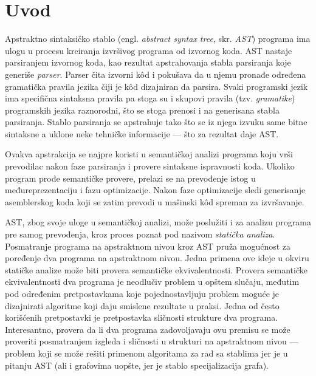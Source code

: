 \chapter{Uvod}
\label{chp:Intro}

Apstraktno sintaksičko stablo (engl. \emph{abstract syntax tree}, skr. \emph{AST}) programa ima ulogu u procesu kreiranja izvršivog programa od izvornog koda. AST nastaje parsiranjem izvornog koda, kao rezultat apstrahovanja stabla parsiranja koje generiše \emph{parser}. Parser čita izvorni k\^od i pokušava da u njemu pronađe određena gramatička pravila jezika čiji je k\^od dizajniran da parsira. Svaki programski jezik ima specifična sintaksna pravila pa stoga su i skupovi pravila (tzv. \emph{gramatike}) programskih jezika raznorodni, što se stoga prenosi i na generisana stabla parsiranja. Stablo parsiranja se apstrahuje tako što se iz njega izvuku same bitne sintaksne a uklone neke tehničke informacije --- što za rezultat daje AST.

Ovakva apstrakcija se najpre koristi u semantičkoj analizi programa koju vrši prevodilac nakon faze parsiranja i provere sintaksne ispravnosti koda. Ukoliko program prođe semantičke provere, prelazi se na prevođenje istog u međureprezentaciju i fazu optimizacije. Nakon faze optimizacije sledi generisanje asemblerskog koda koji se zatim prevodi u mašinski k\^od spreman za izvršavanje.

AST, zbog svoje uloge u semantičkoj analizi, može poslužiti i za analizu programa pre samog prevođenja, kroz proces poznat pod nazivom \emph{statička analiza}. Posmatranje programa na apstraktnom nivou kroz AST pruža mogućnost za poređenje dva programa na apstraktnom nivou. Jedna primena ove ideje u okviru statičke analize može biti provera semantičke ekvivalentnosti. Provera semantičke ekvivalentnosti dva programa je neodlučiv problem u opštem slučaju, međutim pod određenim pretpostavkama koje pojednostavljuju problem moguće je dizajnirati algoritme koji daju smislene rezultate u praksi. Jedna od često korišćenih pretpostavki je pretpostavka sličnosti strukture dva programa. Interesantno, provera da li dva programa zadovoljavaju ovu premisu se može proveriti posmatranjem izgleda i sličnosti u strukturi na apstraktnom nivou --- problem koji se može rešiti primenom algoritama za rad sa stablima jer je u pitanju AST (ali i grafovima uopšte, jer je stablo specijalizacija grafa).

